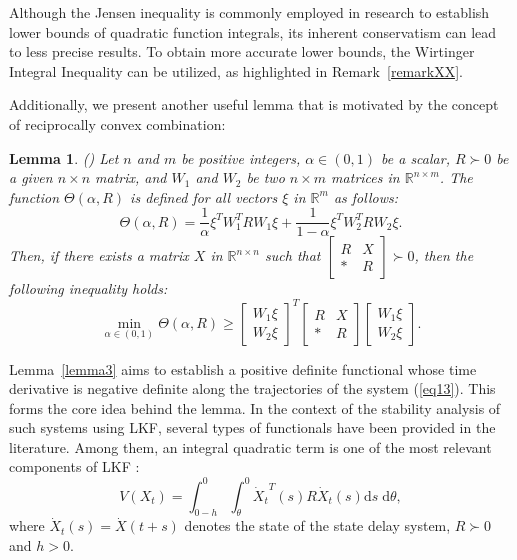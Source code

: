 \documentclass[journal]{IEEEtran}
\newtheorem{lemma}[theorem]{Lemma}
\begin{document}
Although the Jensen inequality \citep{Gu2003} is commonly employed in research to establish lower bounds of quadratic function integrals, its inherent conservatism can lead to less precise results. To obtain more accurate lower bounds, the Wirtinger Integral Inequality can be utilized, as highlighted in Remark~\ref{remarkXX}.

Additionally, we present another useful lemma that is motivated by the concept of reciprocally convex combination:
\begin{lemma}
  \label{lemma2}
  (\citep{park_reciprocally_2011}) Let $n$ and $m$ be positive integers, $\alpha \in (0,1)$ be a scalar, $R \succ 0$ be a given $n \times n$ matrix, and $W_1$ and $W_2$ be two $n \times m$ matrices in $\mathbb{R}^{n \times m}$. The function $\Theta (\alpha ,R)$ is defined for all vectors $\xi$ in $\mathbb{R}^m$ as follows:
  \begin{equation}
    \Theta (\alpha ,R) = \frac{1}{\alpha }{\xi ^T}W_1^TR{W_1}\xi  + \frac{1}{{1 - \alpha }}{\xi ^T}W_2^TR{W_2}\xi.
    \label{eqlemma21}
  \end{equation}
  Then, if there exists a matrix $X$ in $ {\mathbb{R}^{n \times n}} $ such that $ \left[ {\begin{array}{*{20}{l}}
            R & X \\
            * & R
          \end{array}} \right] \succ 0 $, then the following inequality holds:
  \begin{equation}
    \mathop {\min }\limits_{\alpha  \in (0,1)} \Theta (\alpha ,R) \geqslant {\left[ {\begin{array}{*{20}{l}}
              {{W_1}\xi } \\
              {{W_2}\xi }
            \end{array}} \right]^T}\left[ {\begin{array}{*{20}{c}}
            R & X \\
            * & R
          \end{array}} \right]\left[ {\begin{array}{*{20}{l}}
            {{W_1}\xi } \\
            {{W_2}\xi }
          \end{array}} \right].
    \label{eqlemma22}
  \end{equation}
\end{lemma}


Lemma~\ref{lemma3} aims to establish a positive definite functional whose time derivative is negative definite along the trajectories of the system (\ref{eq13}). This forms the core idea behind the lemma. In the context of the stability analysis of such systems using LKF, several types of functionals have been provided in the literature. Among them, an integral quadratic term is one of the most relevant components of LKF \citep{pepe_lyapunovkrasovskii_2006}:
\begin{equation}
  V\left( {{X_t}} \right) = \int_{0 - h}^0 {\int_\theta ^0 {{{\dot X}_t}^T(s)R{{\dot X}_t}(s){\text{d}}s\;{\text{d}}\theta } },
  \label{eq16}
\end{equation}
where $ {\dot X_t}(s) = {\dot X}(t + s) $ denotes the state of the state delay system, $ R \succ 0 $ and $ h > 0 $.
\end{document}
